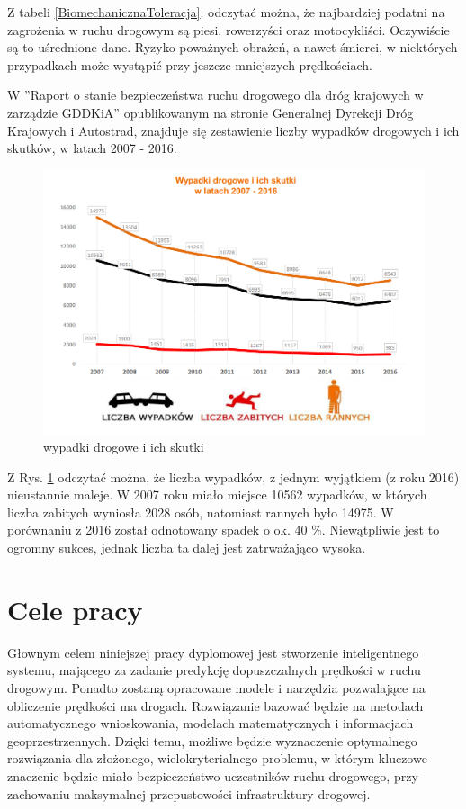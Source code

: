 Z tabeli \ref{BiomechanicznaToleracja}. odczytać można, że najbardziej podatni na zagrożenia w ruchu drogowym są piesi, rowerzyści oraz motocykliści. Oczywiście są to uśrednione dane. Ryzyko poważnych obrażeń, a nawet śmierci, w niektórych przypadkach może wystąpić przy jeszcze mniejszych prędkościach.

\newpage


W ''Raport o stanie bezpieczeństwa ruchu drogowego dla dróg krajowych w zarządzie GDDKiA'' opublikowanym na stronie Generalnej Dyrekcji Dróg Krajowych i Autostrad, znajduje się zestawienie liczby wypadków drogowych i ich skutków, w latach 2007 - 2016.

\begin{figure}[h]
\caption{wypadki drogowe i ich skutki}
\label{wypadkiSkutki}
\centering
\includegraphics[width=1.1\textwidth]{picture1}
\end{figure}

Z Rys. \ref{wypadkiSkutki} odczytać można, że liczba wypadków, z jednym wyjątkiem (z roku 2016) nieustannie maleje. W 2007 roku miało miejsce 10562 wypadków, w których liczba zabitych wyniosła 2028 osób, natomiast rannych było 14975. W porównaniu z 2016 został odnotowany spadek o ok. 40 \%. Niewątpliwie jest to ogromny sukces, jednak liczba ta dalej jest zatrważająco wysoka. 

\newpage
\section{Cele pracy}
\label{sec:celePracy}

Głownym celem niniejszej pracy dyplomowej jest stworzenie inteligentnego systemu, mającego za zadanie predykcję dopuszczalnych prędkości w ruchu drogowym. Ponadto zostaną opracowane modele i narzędzia pozwalające na obliczenie prędkości ma drogach. Rozwiązanie bazować będzie na metodach automatycznego wnioskowania, modelach matematycznych i informacjach geoprzestrzennych. Dzięki temu, możliwe będzie wyznaczenie optymalnego rozwiązania dla złożonego, wielokryterialnego problemu, w którym kluczowe znaczenie będzie miało bezpieczeństwo uczestników ruchu drogowego, przy zachowaniu maksymalnej przepustowości infrastruktury drogowej.

